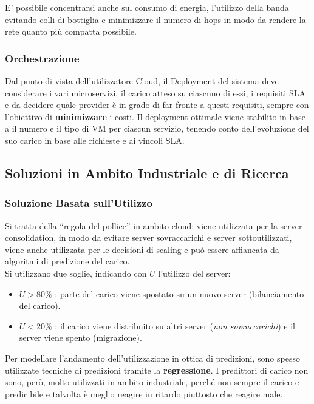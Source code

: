 \documentclass{article}
\providecommand{\tightlist}{%
		  \setlength{\itemsep}{0pt}\setlength{\parskip}{0pt}}
\begin{document}
		E' possibile concentrarsi anche sul consumo di energia, l'utilizzo della banda evitando colli di bottiglia e minimizzare il numero di hops in modo da rendere la rete quanto più compatta possibile.
		
		\subsubsection{Orchestrazione}\label{orchestrazione}
		
		Dal punto di vista dell'utilizzatore Cloud, il Deployment del sistema deve considerare i vari	microservizi, il carico atteso su ciascuno di essi, i requisiti SLA e da decidere quale provider è in grado di far fronte a questi requisiti, sempre con l'obiettivo di \textbf{minimizzare} i costi. Il deployment ottimale viene stabilito in base a  il numero e il tipo di	VM per ciascun servizio, tenendo conto dell'evoluzione del
		suo carico in base alle richieste e ai vincoli SLA.
		
		\subsection{Soluzioni in Ambito Industriale e di Ricerca}\label{soluzioni-in-ambito-industriale-e-di-ricerca}
		
		\subsubsection{Soluzione Basata sull'Utilizzo}\label{soluzione-basata-sullutilizzo}
		
		Si tratta della ``regola del pollice'' in ambito cloud: viene utilizzata per la server consolidation, in modo da evitare server sovraccarichi e server sottoutilizzati, viene anche utilizzata per le decisioni di scaling e può essere affiancata da algoritmi di predizione del carico.\\
		Si utilizzano due soglie, indicando con \(U\) l'utilizzo del server:
		
		\begin{itemize}
		\tightlist
		\item
		  \(U > 80\%\) : parte del carico viene spostato su un nuovo server
		  (bilanciamento del carico).
		\item
		  \(U < 20\%\) : il carico viene distribuito su altri server (\emph{non
		  sovraccarichi}) e il server viene spento (migrazione).
		\end{itemize}
		Per modellare l'andamento dell'utilizzazione in ottica di predizioni, sono spesso utilizzate tecniche di predizioni tramite la \textbf{regressione}.
		I predittori di carico non sono, però, molto utilizzati in ambito industriale,
		perché non sempre il carico e predicibile e talvolta è
		meglio reagire in ritardo piuttosto che reagire male. 
		
\end{document}
